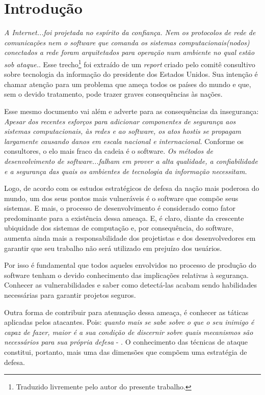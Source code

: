 
\chapter{Introdução}
\label{chap:introducao}

	\textsl{A Internet...foi projetada no espírito da confiança. Nem os protocolos
		de rede de comunicações nem o software que comanda os sistemas computacionais(nodos)
		conectados a rede foram arquitetados para operação num ambiente 
		no qual estão sob ataque.}\cite{PITAC2005}. 
	Esse trecho\footnote{Traduzido livremente pelo autor do presente trabalho.\label{fn:trad}}
	foi extraído de um \textsl{report} criado pelo comitê consultivo sobre tecnologia da
	informação do presidente dos Estados Unidos. Sua intenção é chamar atenção para
	um problema que ameça todos os países do mundo e que, sem o devido tratamento,
	pode trazer graves consequências às nações.


	Esse mesmo documento vai além e adverte para as consequências da insegurança:
	\textsl{Apesar dos recentes esforços para adicionar componentes de segurança aos
		sistemas computacionais, às redes e ao software, os atos hostis
		se propagam largamente causando danos em escala nacional e internacional.}
	Conforme os consultores, o elo mais fraco da cadeia é o software.
	\textsl{Os métodos de desenvolvimento de software...falham em prover
		a alta qualidade, a confiabilidade e a segurança das quais os ambientes
		de tecnologia da informação necessitam.}


	Logo, de acordo com os estudos estratégicos de defesa da nação mais poderosa do mundo,
	um dos seus pontos mais vulneráveis é o software que compõe seus sistemas. E mais,
	o processo de desenvolvimento é considerado como fator predominante para a existência
	dessa ameaça. E, é claro, diante da crescente ubiquidade dos sistemas de computação e, 
	por consequência, do software, aumenta ainda mais a responsabilidade dos projetistas e 
	dos desenvolvedores em garantir que seu trabalho não será utilizado em prejuízo dos usuários.


	Por isso é fundamental que todos aqueles envolvidos no processo de produção
	do software tenham o devido conhecimento das implicações relativas à segurança.
	Conhecer as vulnerabilidades e saber como detectá-las acabam sendo habilidades
	necessárias para garantir projetos seguros.

	
	Outra forma de contribuir para atenuação dessa ameaça, é conhecer as táticas aplicadas
	pelos atacantes. Pois: \textsl{quanto mais se sabe sobre o que o seu inimigo é capaz de fazer,
	maior é a sua condição de discernir sobre quais mecanismos são necessários para sua própria
	defesa} - \cite{Harris2008}. O conhecimento das técnicas de ataque 
	constitui, portanto, mais uma das dimensões que compõem uma estratégia de defesa.	

